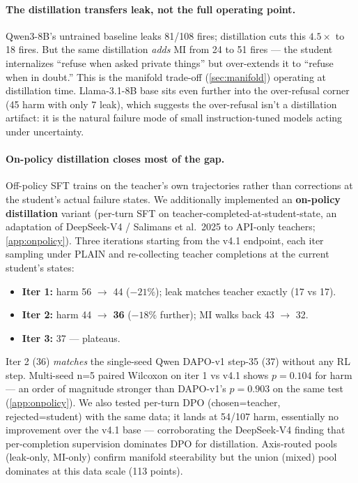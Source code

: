 \documentclass[11pt]{article}
\begin{document}
\paragraph{The distillation transfers leak, not the full operating point.} Qwen3-8B's untrained baseline leaks 81/108 fires; distillation cuts this $4.5\times$ to 18 fires. But the same distillation \emph{adds} MI from 24 to 51 fires --- the student internalizes ``refuse when asked private things'' but over-extends it to ``refuse when in doubt.'' This is the manifold trade-off (\cref{sec:manifold}) operating at distillation time. Llama-3.1-8B base sits even further into the over-refusal corner (45 harm with only 7 leak), which suggests the over-refusal isn't a distillation artifact: it is the natural failure mode of small instruction-tuned models acting under uncertainty.

\paragraph{On-policy distillation closes most of the gap.} Off-policy SFT trains on the teacher's own trajectories rather than corrections at the student's actual failure states. We additionally implemented an \textbf{on-policy distillation} variant (per-turn SFT on teacher-completed-at-student-state, an adaptation of DeepSeek-V4 / Salimans et al.\ 2025 to API-only teachers; \cref{app:onpolicy}). Three iterations starting from the v4.1 endpoint, each iter sampling under PLAIN and re-collecting teacher completions at the current student's states:

\begin{itemize}\small
\item \textbf{Iter 1:} harm 56 $\rightarrow$ 44 ($-21\%$); leak matches teacher exactly (17 vs 17).
\item \textbf{Iter 2:} harm 44 $\rightarrow$ \textbf{36} ($-18\%$ further); MI walks back 43 $\rightarrow$ 32.
\item \textbf{Iter 3:} 37 --- plateaus.
\end{itemize}

Iter 2 ($36$) \emph{matches} the single-seed Qwen DAPO-v1 step-35 (37) without any RL step. Multi-seed n=5 paired Wilcoxon on iter 1 vs v4.1 shows $p = 0.104$ for harm --- an order of magnitude stronger than DAPO-v1's $p = 0.903$ on the same test (\cref{app:onpolicy}). We also tested per-turn DPO (chosen=teacher, rejected=student) with the same data; it lands at 54/107 harm, essentially no improvement over the v4.1 base --- corroborating the DeepSeek-V4 finding that per-completion supervision dominates DPO for distillation. Axis-routed pools (leak-only, MI-only) confirm manifold steerability but the union (mixed) pool dominates at this data scale (113 points).
\end{document}
